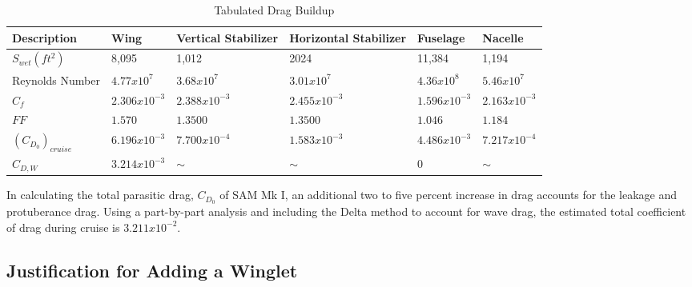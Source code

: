 \begin{table}[!h]
    \centering
    \caption{Tabulated Drag Buildup}
    \begin{tabular}{|p{0.75in}|p{0.75in}|p{0.75in}|p{0.75in}|p{0.75in}|p{0.75in}|}\toprule
        \textbf{Description} & \textbf{Wing} & \textbf{Vertical \newline Stabilizer} & \textbf{Horizontal \newline Stabilizer} & \textbf{Fuselage} & \textbf{Nacelle}  \\ \midrule \hline
        $S_{wet} (ft^2)$ & 8,095 & 1,012 & 2024 & 11,384 & 1,194 \\ \hline
        Reynolds Number & $4.77x10^7$ & $3.68x10^7$ & $3.01x10^7$ & $4.36 x 10^8$ & $5.46 x 10^7$ \\ \hline
        $C_{f}$ & $2.306 x 10^{-3}$ & $2.388 x 10^{-3}$ & $2.455 x 10^{-3}$ & $1.596 x 10^{-3}$ & $2.163 x 10^{-3}$ \\ \hline
        $FF$ & $1.570$ & $1.3500$ & $1.3500$ & $1.046$ & $1.184$ \\ \hline
        \textbf{$(C_{D_{0}})_{cruise}$} & $6.196 x 10^{-3}$ & $7.700 x 10^{-4}$ & $1.583 x 10^{-3}$ & $4.486 x 10^{-3}$ & $7.217x10^{-4}$ \\ \midrule
        \textbf{$C_{D,W}$} & $3.214 x 10^{-3}$ & $\sim$ & $\sim$ & 0 & $\sim$ \\ \hline
        
    \end{tabular}
    \label{tab:dragbuildup}
\end{table}

In calculating the total parasitic drag, $C_{D_{0}}$ of SAM Mk I, an additional two to five percent increase in drag accounts for the leakage and protuberance drag. \cite{raymer}  Using a part-by-part analysis and including the Delta method to account for wave drag, the estimated total coefficient of drag during cruise is $3.211 x 10^{-2}$.

\subsection{Justification for Adding a Winglet}






